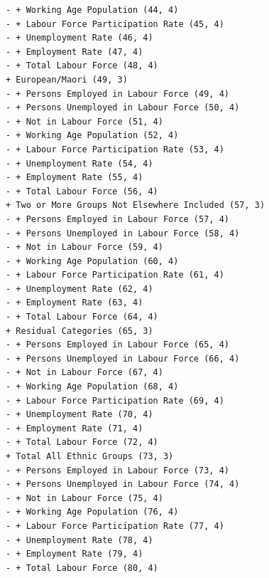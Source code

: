 \documentclass[a4paper]{article}
\begin{document}
\begin{verbatim}
- + Working Age Population (44, 4)
- + Labour Force Participation Rate (45, 4)
- + Unemployment Rate (46, 4)
- + Employment Rate (47, 4)
- + Total Labour Force (48, 4)
+ European/Maori (49, 3)
- + Persons Employed in Labour Force (49, 4)
- + Persons Unemployed in Labour Force (50, 4)
- + Not in Labour Force (51, 4)
- + Working Age Population (52, 4)
- + Labour Force Participation Rate (53, 4)
- + Unemployment Rate (54, 4)
- + Employment Rate (55, 4)
- + Total Labour Force (56, 4)
+ Two or More Groups Not Elsewhere Included (57, 3)
- + Persons Employed in Labour Force (57, 4)
- + Persons Unemployed in Labour Force (58, 4)
- + Not in Labour Force (59, 4)
- + Working Age Population (60, 4)
- + Labour Force Participation Rate (61, 4)
- + Unemployment Rate (62, 4)
- + Employment Rate (63, 4)
- + Total Labour Force (64, 4)
+ Residual Categories (65, 3)
- + Persons Employed in Labour Force (65, 4)
- + Persons Unemployed in Labour Force (66, 4)
- + Not in Labour Force (67, 4)
- + Working Age Population (68, 4)
- + Labour Force Participation Rate (69, 4)
- + Unemployment Rate (70, 4)
- + Employment Rate (71, 4)
- + Total Labour Force (72, 4)
+ Total All Ethnic Groups (73, 3)
- + Persons Employed in Labour Force (73, 4)
- + Persons Unemployed in Labour Force (74, 4)
- + Not in Labour Force (75, 4)
- + Working Age Population (76, 4)
- + Labour Force Participation Rate (77, 4)
- + Unemployment Rate (78, 4)
- + Employment Rate (79, 4)
- + Total Labour Force (80, 4)


\end{verbatim}
\end{document}
